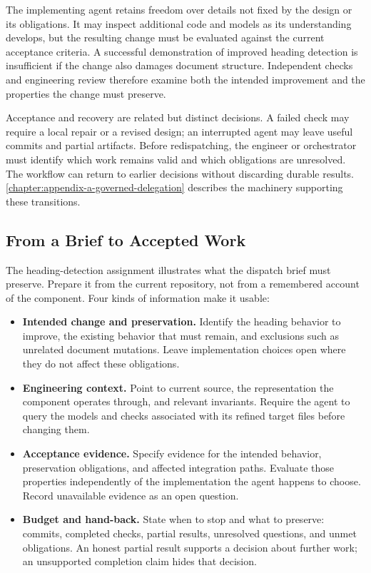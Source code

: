 The implementing agent retains freedom over details not fixed by the design or its obligations. It may inspect additional code and models as its understanding develops, but the resulting change must be evaluated against the current acceptance criteria. A successful demonstration of improved heading detection is insufficient if the change also damages document structure. Independent checks and engineering review therefore examine both the intended improvement and the properties the change must preserve.

Acceptance and recovery are related but distinct decisions. A failed check may require a local repair or a revised design; an interrupted agent may leave useful commits and partial artifacts. Before redispatching, the engineer or orchestrator must identify which work remains valid and which obligations are unresolved. The workflow can return to earlier decisions without discarding durable results. \autoref{chapter:appendix-a-governed-delegation} describes the machinery supporting these transitions.

\subsection{From a Brief to Accepted Work}\label{heading:from-a-brief-to-accepted-work}

The heading-detection assignment illustrates what the dispatch brief must preserve. Prepare it from the current repository, not from a remembered account of the component. Four kinds of information make it usable:

\begin{itemize}
\tightlist
\item \textbf{Intended change and preservation.} Identify the heading behavior to improve, the existing behavior that must remain, and exclusions such as unrelated document mutations. Leave implementation choices open where they do not affect these obligations.
\item \textbf{Engineering context.} Point to current source, the representation the component operates through, and relevant invariants. Require the agent to query the models and checks associated with its refined target files before changing them.
\item \textbf{Acceptance evidence.} Specify evidence for the intended behavior, preservation obligations, and affected integration paths. Evaluate those properties independently of the implementation the agent happens to choose. Record unavailable evidence as an open question.
\item \textbf{Budget and hand-back.} State when to stop and what to preserve: commits, completed checks, partial results, unresolved questions, and unmet obligations. An honest partial result supports a decision about further work; an unsupported completion claim hides that decision.
\end{itemize}

